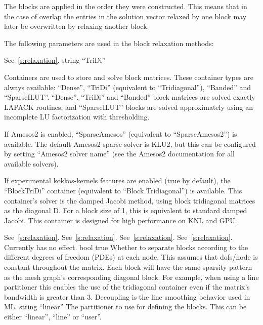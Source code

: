 The blocks are applied in the order they were constructed. This means that in
the case of overlap the entries in the solution vector relaxed by one block may
later be overwritten by relaxing another block.

The following parameters are used in the block relaxation methods:

    {See~\ref{s:relaxation}.}
    {string}
    {``TriDi''}
    {Containers are used to store and solve block matrices. These container
     types are always available: ``Dense'', ``TriDi''
     (equivalent to ``Tridiagonal''), ``Banded'' and ``SparseILUT''.
     ``Dense'', ``TriDi'' and ``Banded'' block matrices are
     solved exactly LAPACK routines, and ``SparseILUT'' blocks are solved approximately
     using an incomplete LU factorization with thresholding.

     If Amesos2 is enabled, ``SparseAmesos'' (equivalent to ``SparseAmesos2'') is available.
     The default Amesos2 sparse solver is KLU2, but this can be configured by setting
     ``Amesos2 solver name'' (see the Amesos2 documentation for all available solvers).

     If experimental kokkos-kernels features are enabled (true by default), the ``BlockTriDi''
     container (equivalent to ``Block Tridiagonal'') is available. This container's solver is the damped Jacobi method, using
     block tridiagonal matrices as the diagonal D.
     For a block size of 1, this is equivalent to standard damped Jacobi.
     This container is designed for high performance on KNL and GPU.}
    {See~\ref{s:relaxation}.}
    {See~\ref{s:relaxation}.}
    {See~\ref{s:relaxation}.}
    {See~\ref{s:relaxation}. Currently has no effect. }
    {bool}
    {true}
    {Whether to separate blocks according to the different degrees of
     freedom (PDEs) at each node. This assumes that dofs/node is constant
     throughout the matrix. Each block will have the same sparsity
     pattern as the mesh graph's corresponding diagonal block.
     For example, when using a line partitioner this
     enables the use of the tridiagonal container even if the matrix's
     bandwidth is greater than 3.
     Decoupling is the line smoothing behavior used in ML.}
    {string}
    {``linear''}
    {The partitioner to use for defining the blocks.  This can be either
     ``linear'', ``line'' or ``user''.}
